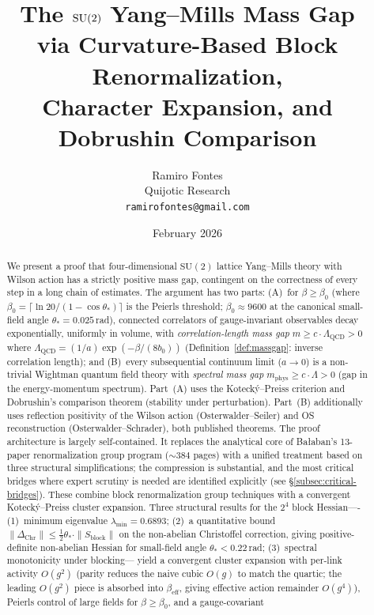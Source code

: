 \documentclass[11pt]{article}
\title{The $\SU(2)$ Yang--Mills Mass Gap\\
via Curvature-Based Block Renormalization,\\
Character Expansion, and Dobrushin Comparison}
\author{Ramiro Fontes\\Quijotic Research\\\texttt{ramirofontes@gmail.com}}
\date{February 2026}
\theoremstyle{definition}
\newcommand{\SU}{\mathrm{SU}}
\newcommand{\Lam}{\Lambda_{\mathrm{QCD}}}
\begin{document}
\maketitle

\begin{abstract}
We present a proof that four-dimensional $\SU(2)$ lattice
Yang--Mills theory with Wilson action has a strictly positive
mass gap, contingent on the correctness of
every step in a long chain of estimates.
The argument has two parts:
(A)~for $\beta\ge\beta_0$ (where
$\beta_0=\lceil\ln 20/(1-\cos\theta_*)\rceil$ is the Peierls
threshold; $\beta_0\approx 9600$ at the canonical small-field
angle $\theta_*=0.025$\,rad), connected correlators of gauge-invariant
observables decay exponentially, uniformly in volume, with
\emph{correlation-length mass gap}
$m\ge c\cdot\Lam>0$ where $\Lam=(1/a)\exp(-\beta/(8b_0))$
(Definition~\ref{def:massgap}: inverse correlation length); and
(B)~every subsequential continuum limit ($a\to 0$) is a
non-trivial Wightman quantum field
theory with \emph{spectral mass gap} $m_{\mathrm{phys}}\ge c\cdot\Lambda>0$
(gap in the energy-momentum spectrum).
Part~(A) uses the Koteck\'y--Preiss criterion and
Dobrushin's comparison theorem (stability under perturbation).
Part~(B) additionally uses reflection positivity
of the Wilson action (Osterwalder--Seiler) and OS reconstruction
(Osterwalder--Schrader), both published theorems.
The proof architecture is largely
self-contained.  It replaces the analytical core of Ba\l aban's
13-paper renormalization group program (${\sim}384$ pages)
with a unified treatment
based on three structural simplifications;
the compression is substantial, and the most critical
bridges where expert scrutiny is needed are identified
explicitly (see \S\ref{subsec:critical-bridges}).
These combine block
renormalization group techniques with a convergent Koteck\'y--Preiss
cluster expansion.  Three structural results for the
$2^4$ block Hessian----%
(1)~minimum eigenvalue $\lambda_{\min}=0.6893$;
(2)~a quantitative bound $\|\Delta_{\mathrm{Chr}}\|\le\tfrac{1}{2}\theta_*\cdot
\|S_{\mathrm{block}}\|$ on the non-abelian Christoffel correction, giving
positive-definite non-abelian Hessian for small-field angle $\theta_*<0.22$\,rad;
(3)~spectral monotonicity under blocking---%
yield a convergent cluster expansion with per-link activity $O(g^2)$
(parity reduces the naive cubic $O(g)$ to match the quartic; the
leading $O(g^2)$ piece is absorbed into $\beta_{\mathrm{eff}}$,
giving effective action remainder $O(g^4)$), Peierls
control of large fields for $\beta\ge\beta_0$, and a gauge-covariant

\end{abstract}
\end{document}
